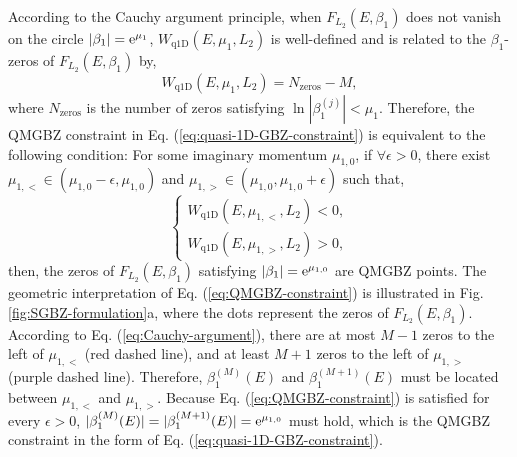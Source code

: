 According to the Cauchy argument principle, when $F_{L_{2}}(E,\beta_{1})$
does not vanish on the circle $|\beta_{1}|=\mathrm{e}^{\mu_{1}}$, $W_{\text{q1D}}(E,\mu_{1},L_{2})$
is well-defined and is related to the $\beta_{1}$-zeros of $F_{L_{2}}(E,\beta_{1})$
by, 
\begin{equation}
W_{\text{q1D}}\left(E,\mu_{1},L_{2}\right)=N_{\text{zeros}}-M,\label{eq:Cauchy-argument}
\end{equation}
where $N_{\text{zeros}}$ is the number of zeros satisfying $\ln|\beta_{1}^{(j)}|<\mu_{1}$.
Therefore, the QMGBZ constraint in Eq. (\ref{eq:quasi-1D-GBZ-constraint})
is equivalent to the following condition: For some imaginary momentum
$\mu_{1,0}$, if $\forall\epsilon>0$, there exist $\mu_{1,<}\in(\mu_{1,0}-\epsilon,\mu_{1,0})$
and $\mu_{1,>}\in(\mu_{1,0},\mu_{1,0}+\epsilon)$ such that, 
\begin{equation}
\begin{cases}
W_{\text{q1D}}\left(E,\mu_{1,<},L_{2}\right)<0,\\
W_{\text{q1D}}\left(E,\mu_{1,>},L_{2}\right)>0,
\end{cases}\label{eq:QMGBZ-constraint}
\end{equation}
then, the zeros of $F_{L_{2}}(E,\beta_{1})$ satisfying $|\beta_{1}|=\mathrm{e}^{\mu_{1,0}}$
are QMGBZ points. The geometric interpretation of Eq. (\ref{eq:QMGBZ-constraint})
is illustrated in Fig. \ref{fig:SGBZ-formulation}a, where the dots
represent the zeros of $F_{L_{2}}(E,\beta_{1})$. According to Eq.
(\ref{eq:Cauchy-argument}), there are at most $M-1$ zeros to the
left of $\mu_{1,<}$ (red dashed line), and at least $M+1$ zeros
to the left of $\mu_{1,>}$ (purple dashed line). Therefore, $\beta_{1}^{(M)}(E)$
and $\beta_{1}^{(M+1)}(E)$ must be located between $\mu_{1,<}$ and
$\mu_{1,>}$. Because Eq. (\ref{eq:QMGBZ-constraint}) is satisfied
for every $\epsilon>0$, $|\beta_{1}^{(M)}(E)|=|\beta_{1}^{(M+1)}(E)|=\mathrm{e}^{\mu_{1,0}}$
must hold, which is the QMGBZ constraint in the form of Eq. (\ref{eq:quasi-1D-GBZ-constraint}).

